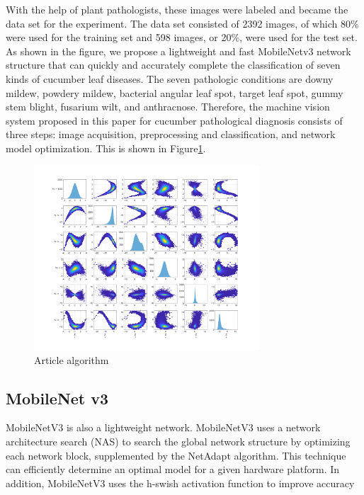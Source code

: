 \documentclass[a4paper,fleqn]{cas-sc}
\begin{document}
With the help of plant pathologists, these images were labeled and became the data set for the experiment. The data set consisted of 2392 images, of which 80\% were used for the training set and 598 images, or 20\%, were used for the test set. As shown in the figure, we propose a lightweight and fast MobileNetv3 network structure that can quickly and accurately complete the classification of seven kinds of cucumber leaf diseases. The seven pathologic conditions are downy mildew, powdery mildew, bacterial angular leaf spot, target leaf spot, gummy stem blight, fusarium wilt, and anthracnose. Therefore, the machine vision system proposed in this paper for cucumber pathological diagnosis consists of three steps: image acquisition, preprocessing and classification, and network model optimization. This is shown in Figure\ref{fig:f2}.
\begin{figure}
\centering
\includegraphics[width=0.75\textwidth]{figs/f2.png}
\caption{Article algorithm}
\label{fig:f2}
\end{figure}

\subsection{MobileNet v3}
MobileNetV3 is also a lightweight network. MobileNetV3 uses a network architecture search (NAS) to search the global network structure by optimizing each network block, supplemented by the NetAdapt algorithm. This technique can efficiently determine an optimal model for a given hardware platform. In addition, MobileNetV3 uses the h-swish activation function to improve accuracy \cite{howard2019searching}
\end{document}
